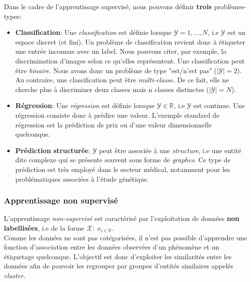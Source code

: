 \noindent Dans le cadre de l'apprentissage supervisé, nous pouvons définir \textbf{trois} problèmes-types:
\begin{itemize}
    \item \textbf{Classification}: Une \textit{classification} est définie lorsque $\mathcal{Y}={1,...,N}$, i.e $\mathcal{Y}$ est un espace discret (et fini). Un problème de classification revient donc à étiqueter une entrée inconnue avec un label. Nous pouvons citer, par exemple, la discrimination d'images selon ce qu'elles représentent. Une classification peut être \textit{binaire}. Nous avons donc un problème de type "est/n'est pas" ($|\mathcal{Y}|=2$). Au contraire, une classification peut être \textit{multi-classe}. De ce fait, elle ne cherche plus à discriminer deux classes mais n classes distinctes ($|\mathcal{Y}|=N$).

    \item \textbf{Régression}: Une \textit{régression} est définie lorsque $\mathcal{Y} \in \mathbb{R}$, i.e $\mathcal{Y}$ est continue. Une régression consiste donc à prédire une valeur. L'exemple standard de régression est la prédiction de prix ou d'une valeur dimensionnelle quelconque.

    \item \textbf{Prédiction structurée}: $\mathcal{Y}$ peut être associée à une \textit{structure}, i.e une entité dite complexe qui se présente souvent sous forme de \textit{graphes}. Ce type de prédiction est très employé dans le secteur médical, notamment pour les problématiques associées à l'étude génétique.
\end{itemize}

\subsubsection{Apprentissage non supervisé}

\noindent L'apprentissage \textit{non-supervisé} est caractérisé par l'exploitation de données \textbf{non labellisées}, i.e de la forme $\mathcal{X}: \ x_{i \in \mathbb{R}}$.\\

\noindent Comme les données ne sont pas catégorisées, il n'est pas possible d'apprendre une fonction d'association entre les données observées d'un phénomène et un étiquetage quelconque. L'objectif est donc d'exploiter les similarités entre les données afin de pouvoir les regrouper par groupes d'entités similaires appelés \textit{cluster}. \\

